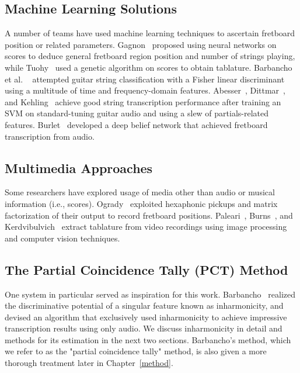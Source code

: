 \documentclass[12pt]{cmuthesis}
\begin{document}
\subsection{Machine Learning Solutions}
A number of teams have used machine learning techniques to ascertain fretboard position or related parameters. Gagnon~\cite{gagnon2003} proposed using neural networks on scores to deduce general fretboard region position and number of strings playing, while Tuohy~\cite{asdf} used a genetic algorithm on scores to obtain tablature. Barbancho et al. ~\cite{barbancho2009} attempted guitar string classification with a Fisher linear discriminant using a multitude of time and frequency-domain features. Abesser~\cite{abesser2012}, Dittmar~\cite{dittmar2013}, and Kehling~\cite{kehling2014} achieve good string transcription performance after training an SVM on standard-tuning guitar audio and using a slew of partials-related features. Burlet~\cite{} developed a deep belief network that achieved fretboard transcription from audio.

\subsection{Multimedia Approaches}
Some researchers have explored usage of media other than audio or musical information (i.e., scores). Ogrady~\cite{} exploited hexaphonic pickups and matrix factorization of their output to record fretboard positions. Paleari~\cite{}, Burns~\cite{}, and Kerdvibulvich~\cite{} extract tablature from video recordings using image processing and computer vision techniques.

\subsection{The Partial Coincidence Tally (PCT) Method}
One system in particular served as inspiration for this work. Barbancho~\cite{barbanchoi2012} realized the discriminative potential of a singular feature known as inharmonicity, and devised an algorithm that exclusively used inharmonicity to achieve impressive transcription results using only audio. We discuss inharmonicity in detail and methods for its estimation in the next two sections. Barbancho's method, which we refer to as the "partial coincidence tally" method, is also given a more thorough treatment later in Chapter~\ref{method}.
\end{document}
